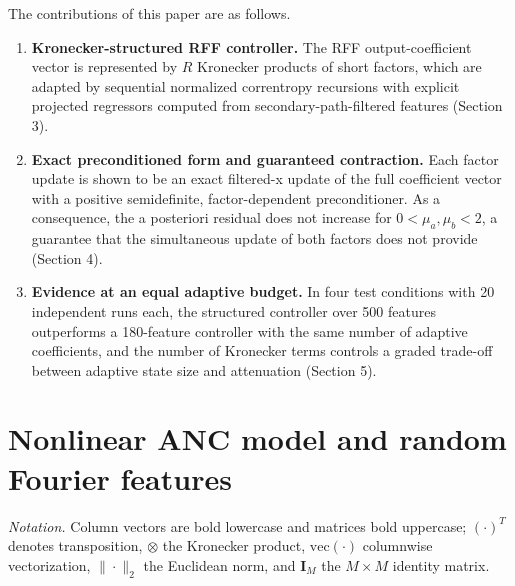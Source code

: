 \documentclass[preprint,12pt]{elsarticle}
\begin{document}
The contributions of this paper are as follows.
\begin{enumerate}
\item \textbf{Kronecker-structured RFF controller.} The RFF output-coefficient vector is represented by $R$ Kronecker products of short factors, which are adapted by sequential normalized correntropy recursions with explicit projected regressors computed from secondary-path-filtered features (Section 3).
\item \textbf{Exact preconditioned form and guaranteed contraction.} Each factor update is shown to be an exact filtered-x update of the full coefficient vector with a positive semidefinite, factor-dependent preconditioner. As a consequence, the a posteriori residual does not increase for $0 < \mu_a, \mu_b < 2$, a guarantee that the simultaneous update of both factors does not provide (Section 4).
\item \textbf{Evidence at an equal adaptive budget.} In four test conditions with 20 independent runs each, the structured controller over 500 features outperforms a 180-feature controller with the same number of adaptive coefficients, and the number of Kronecker terms controls a graded trade-off between adaptive state size and attenuation (Section 5).
\end{enumerate}
\section{Nonlinear ANC model and random Fourier features}
\emph{Notation.} Column vectors are bold lowercase and matrices bold uppercase; $(\cdot)^T$ denotes transposition, $\otimes$ the Kronecker product, $\mathrm{vec}(\cdot)$ columnwise vectorization, $\|\cdot\|_2$ the Euclidean norm, and $\mathbf{I}_M$ the $M \times M$ identity matrix.
\end{document}
